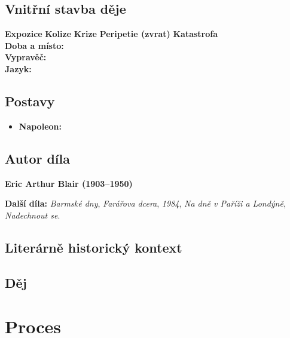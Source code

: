 \documentclass[12pt, a4paper]{article}
\newcommand{\mybf}[1]{\textcolor[RGB]{0, 179, 219}{\textbf{#1}}}
\begin{document}
\subsection*{Vnitřní stavba děje}
\noindent\textbf{Expozice} 
\noindent\textbf{Kolize} 
\noindent\textbf{Krize} 
\noindent\textbf{Peripetie (zvrat)} 
\noindent\textbf{Katastrofa} \\[10pt]
\mybf{Doba a místo:} \\[10pt]
\mybf{Vypravěč:} \\[10pt]
\mybf{Jazyk:} 

\subsection*{Postavy}
\begin{itemize}[itemsep=0.3em]
	\item \textbf{Napoleon:}
\end{itemize}

\subsection*{Autor díla}
\textbf{Eric Arthur Blair (1903--1950)}

\textbf{Další díla:} \textit{Barmské dny}, \textit{Farářova dcera}, \textit{1984}, \textit{Na dně v Paříži a Londýně}, \textit{Nadechnout se}.

\subsection*{Literárně historický kontext}

{\color{subsectioncolor}\hrulefill}
\subsection*{\color{subsectioncolor}Děj}

\newpage


\section{Proces}
\end{document}
